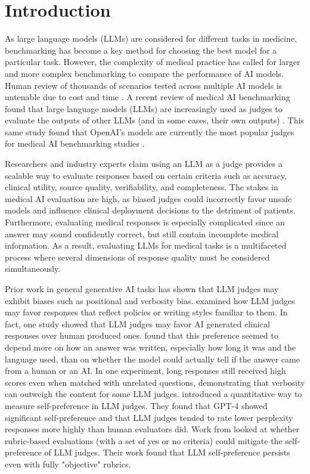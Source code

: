 \documentclass[11pt]{article}
\begin{document}
\section{Introduction}

As large language models (LLMs) are considered for different tasks in medicine, benchmarking has become a key method for choosing the best model for a particular task.  However, the complexity of medical practice has called for larger and more complex benchmarking to compare the performance of AI models. Human review of thousands of scenarios tested across multiple AI models is untenable due to cost and time \citep{zheng2023judging}. A recent review of medical AI benchmarking found that large language models (LLMs) are increasingly used as judges to evaluate the outputs of other LLMs (and in some cases, their own outputs) \citep{li2026llm}. This same study found that OpenAI's models are currently the most popular judges for medical AI benchmarking studies \citep{li2026llm}.

Researchers and industry experts claim using an LLM as a judge provides a scalable way to evaluate responses based on certain criteria such as accuracy, clinical utility, source quality, verifiability, and completeness.  The stakes in medical AI evaluation are high, as biased judges could incorrectly favor unsafe models and influence clinical deployment decisions to the detriment of patients. Furthermore, evaluating medical responses is especially complicated since an answer may sound confidently correct, but still contain incomplete medical information. As a result, evaluating LLMs for medical tasks is a multifaceted process where several dimensions of response quality must be considered simultaneously.

Prior work in general generative AI tasks has shown that LLM judges may exhibit biases such as positional and verbosity bias. \cite{wataoka2025selfpreference} examined how LLM judges may favor responses that reflect policies or writing styles familiar to them.  In fact, one study showed that LLM judges may favor AI generated clinical responses over human produced ones. \cite{alvarezarenas2026unreliable} found that this preference seemed to depend more on how an answer was written, especially how long it was and the language used, than on whether the model could actually tell if the answer came from a human or an AI. In one experiment, long responses still received high scores even when matched with unrelated questions, demonstrating that verbosity can outweigh the content for some LLM judges. \cite{wataoka2025selfpreference} introduced a quantitative way to measure self-preference in LLM judges. They found that GPT-4 showed significant self-preference and that LLM judges tended to rate lower perplexity responses more highly than human evaluators did.  Work from \cite{pombal2026selfpreference} looked at whether rubric-based evaluations (with a set of yes or no criteria) could mitigate the self-preference of LLM judges. Their work found that LLM self-preference persists even with fully "objective" rubrics.
\end{document}
